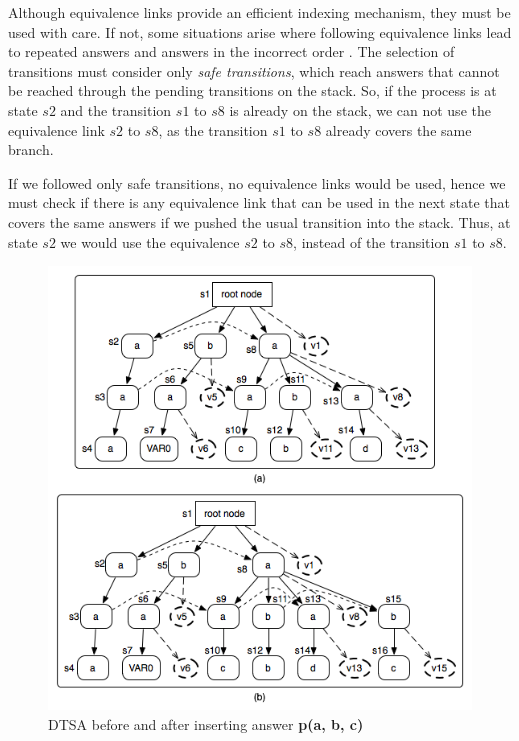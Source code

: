   Although equivalence links provide an efficient indexing mechanism, they must be used with care. If not,
  some situations arise where following equivalence links lead to repeated answers and answers in the incorrect order \cite{Rao-96}.
  The selection of transitions must consider only \textit{safe transitions}, which reach answers that cannot be reached through the pending
  transitions on the stack.
  So, if the process is at state $s2$ and the transition $s1$ to $s8$ is already on the
  stack, we can not use the equivalence link $s2$ to $s8$, as the transition $s1$ to $s8$ already covers the same branch.
  
  If we followed only safe transitions, no equivalence links would be used, hence we must check if there is any
  equivalence link that can be used in the next state that covers the same answers if we pushed the
  usual transition into the stack. Thus, at state $s2$ we would use the equivalence $s2$ to $s8$, instead of
  the transition $s1$ to $s8$.
  
  \begin{figure}[ht]
    \centering
      \includegraphics[scale=0.6]{dtsa.png}
    \caption{DTSA before and after inserting answer \textbf{p(a, b, c)}}
    \label{fig:dtsa_example}
  \end{figure}
   
